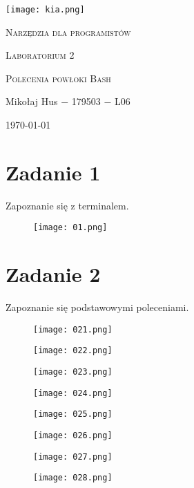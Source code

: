\documentclass[fleqn,onecolumn,a4paper,12pt,titlepage]{article}
\begin{document}
\begin{titlepage}
    \texttt{[image: kia.png]}\par\vspace{3cm}
    \centering
    {\LARGE \textsc{Narzędzia dla programistów} \par}
    \vspace{2cm}
    {\Large \textsc{Laboratorium 2} \par} %
    \vspace{2cm}
    {\textsc{Polecenia powłoki Bash} \par} %
    \vfill
    Mikołaj Hus $-$ 179503 $-$ L06 \par %
    \vspace{2cm}
    {\large {\today} \par}
\end{titlepage}

\section*{Zadanie 1}
Zapoznanie się z terminalem.
\begin{figure}[H]%
    \centering\texttt{[image: 01.png]}
\end{figure}

\section*{Zadanie 2}
Zapoznanie się podstawowymi poleceniami.
\begin{figure}[H]%
    \centering\texttt{[image: 021.png]}
\end{figure}
\begin{figure}[H]%
    \centering\texttt{[image: 022.png]}
\end{figure}
\begin{figure}[H]%
    \centering\texttt{[image: 023.png]}
\end{figure}
\begin{figure}[H]%
    \centering\texttt{[image: 024.png]}
\end{figure}
\begin{figure}[H]%
    \centering\texttt{[image: 025.png]}
\end{figure}
\begin{figure}[H]%
    \centering\texttt{[image: 026.png]}
\end{figure}
\begin{figure}[H]%
    \centering\texttt{[image: 027.png]}
\end{figure}
\begin{figure}[H]%
    \centering\texttt{[image: 028.png]}
\end{figure}
\end{document}
